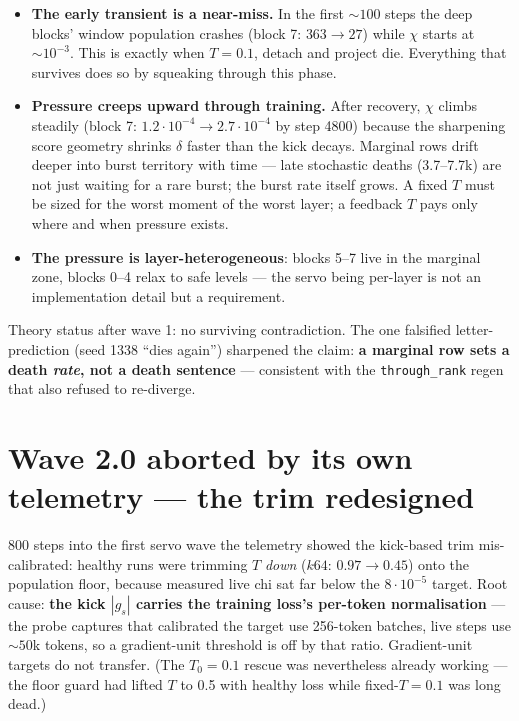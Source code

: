\documentclass[11pt,a4paper]{article}
\newcommand{\code}[1]{\texttt{#1}}
\begin{document}
\begin{itemize}[leftmargin=1.4em]
\item \textbf{The early transient is a near-miss.} In the first ${\sim}100$
  steps the deep blocks' window population crashes (block 7: $363 \to 27$)
  while $\chi$ starts at ${\sim}10^{-3}$. This is exactly when $T{=}0.1$,
  detach and project die. Everything that survives does so by squeaking
  through this phase.
\item \textbf{Pressure creeps upward through training.} After recovery,
  $\chi$ climbs steadily (block 7: $1.2\cdot10^{-4} \to 2.7\cdot10^{-4}$ by
  step 4800) because the sharpening score geometry shrinks $\delta$ faster
  than the kick decays. Marginal rows drift deeper into burst territory with
  time --- late stochastic deaths (3.7--7.7k) are not just waiting for a rare
  burst; the burst rate itself grows. A fixed $T$ must be sized for the worst
  moment of the worst layer; a feedback $T$ pays only where and when pressure
  exists.
\item \textbf{The pressure is layer-heterogeneous}: blocks 5--7 live in the
  marginal zone, blocks 0--4 relax to safe levels --- the servo being
  per-layer is not an implementation detail but a requirement.
\end{itemize}

Theory status after wave 1: no surviving contradiction. The one falsified
letter-prediction (seed 1338 ``dies again'') sharpened the claim: \textbf{a
marginal row sets a death \emph{rate}, not a death sentence} --- consistent
with the \code{through\_rank} regen that also refused to re-diverge.

\section{Wave 2.0 aborted by its own telemetry --- the trim redesigned}

800 steps into the first servo wave the telemetry showed the kick-based trim
mis-calibrated: healthy runs were trimming $T$ \emph{down} ($k64$:
$0.97 \to 0.45$) onto the population floor, because measured live chi sat far
below the $8\cdot10^{-5}$ target. Root cause: \textbf{the kick $|g_s|$
carries the training loss's per-token normalisation} --- the probe captures
that calibrated the target use 256-token batches, live steps use ${\sim}50$k
tokens, so a gradient-unit threshold is off by that ratio. Gradient-unit
targets do not transfer. (The $T_0{=}0.1$ rescue was nevertheless already
working --- the floor guard had lifted $T$ to 0.5 with healthy loss while
fixed-$T{=}0.1$ was long dead.)
\end{document}
